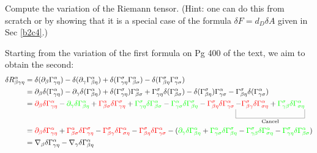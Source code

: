 \documentclass[10pt]{article}
\begin{document}
\begin{example}\label{b3e25}
	Compute the variation of the Riemann tensor. (Hint: one can do this from scratch or by showing that it is a special case of the formula $\delta F = d_D\delta A$ given in Sec \ref{b2c4}.)
\end{example}
\sol Starting from the variation of the first formula on Pg 400 of the text, we aim to obtain the second:
$$
\begin{aligned}
	\delta R_{\beta\gamma\eta}^\alpha &= \delta(\partial_\beta\Gamma_{\gamma\eta}^\alpha) - \delta(\partial_\gamma\Gamma_{\beta\eta}^\alpha) + \delta(\Gamma_{\gamma\eta}^\sigma\Gamma_{\beta\sigma}^\alpha) - \delta(\Gamma_{\beta\eta}^\sigma\Gamma_{\gamma\sigma}^\alpha)\\
	&= \partial_\beta\delta(\Gamma_{\gamma\eta}^\alpha) - \partial_\gamma\delta(\Gamma_{\beta\eta}^\alpha) + \delta(\Gamma_{\gamma\eta}^\sigma)\Gamma_{\beta\sigma}^\alpha + \Gamma_{\gamma\eta}^\sigma\delta(\Gamma_{\beta\sigma}^\alpha) - \delta(\Gamma_{\beta\eta}^\sigma)\Gamma_{\gamma\sigma}^\alpha - \Gamma_{\beta\eta}^\sigma\delta(\Gamma_{\gamma\sigma}^\alpha)\\
	&= {\color{red}\partial_\beta\delta\Gamma_{\gamma\eta}^\alpha} - {\color{green}\partial_\gamma\delta\Gamma_{\beta\eta}^\alpha} + {\color{red}\Gamma_{\beta\sigma}^\alpha\delta\Gamma_{\gamma\eta}^\sigma} + {\color{green}\Gamma_{\gamma\eta}^\sigma\delta\Gamma_{\beta\sigma}^\alpha} - {\color{green}\Gamma_{\gamma\sigma}^\alpha\delta\Gamma_{\beta\eta}^\sigma} - {\color{red}\Gamma_{\beta\eta}^\sigma\delta\Gamma_{\gamma\sigma}^\alpha} \ub{- {\color{red}\Gamma_{\beta\gamma}^\sigma\delta\Gamma_{\sigma\eta}^\alpha} + {\color{green}\Gamma_{\gamma\beta}^\sigma\delta\Gamma_{\sigma\eta}^\alpha}}{\rm Cancel}\\
	&= {\color{red}\partial_\beta\delta\Gamma_{\gamma\eta}^\alpha} + {\color{red}\Gamma_{\beta\sigma}^\alpha\delta\Gamma_{\gamma\eta}^\sigma} - {\color{red}\Gamma_{\beta\gamma}^\sigma\delta\Gamma_{\sigma\eta}^\alpha} - {\color{red}\Gamma_{\beta\eta}^\sigma\delta\Gamma_{\gamma\sigma}^\alpha} - ({\color{green}\partial_\gamma\delta\Gamma_{\beta\eta}^\alpha} + {\color{green}\Gamma_{\gamma\sigma}^\alpha\delta\Gamma_{\beta\eta}^\sigma} - {\color{green}\Gamma_{\gamma\beta}^\sigma\delta\Gamma_{\sigma\eta}^\alpha} - {\color{green}\Gamma_{\gamma\eta}^\sigma\delta\Gamma_{\beta\sigma}^\alpha})\\
	&= \nabla_\beta\delta\Gamma_{\gamma\eta}^\alpha - \nabla_\gamma\delta\Gamma_{\beta\eta}^\alpha
\end{aligned}
$$
\end{document}
